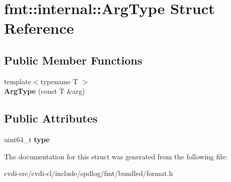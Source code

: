 \hypertarget{structfmt_1_1internal_1_1ArgType}{}\section{fmt\+:\+:internal\+:\+:Arg\+Type Struct Reference}
\label{structfmt_1_1internal_1_1ArgType}
\subsection*{Public Member Functions}
\begin{DoxyCompactItemize}
\item 
{\footnotesize template$<$typename T $>$ }\\{\bfseries Arg\+Type} (const T \&arg)\hypertarget{structfmt_1_1internal_1_1ArgType_a011f9d3d3e6da48d17967466c3d94fc8}{}\label{structfmt_1_1internal_1_1ArgType_a011f9d3d3e6da48d17967466c3d94fc8}

\end{DoxyCompactItemize}
\subsection*{Public Attributes}
\begin{DoxyCompactItemize}
\item 
uint64\+\_\+t {\bfseries type}\hypertarget{structfmt_1_1internal_1_1ArgType_acfa7078681b7047cb448d523f5eb2a54}{}\label{structfmt_1_1internal_1_1ArgType_acfa7078681b7047cb448d523f5eb2a54}

\end{DoxyCompactItemize}


The documentation for this struct was generated from the following file\+:\begin{DoxyCompactItemize}
\item 
cvdi-\/src/cvdi-\/cl/include/spdlog/fmt/bundled/format.\+h\end{DoxyCompactItemize}
